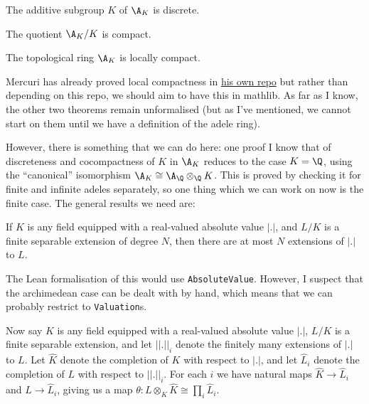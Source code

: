 \begin{theorem}
  \label{NumberField.AdeleRing.discrete}
  The additive subgroup $K$ of $\A_K$ is discrete.
\end{theorem}

\begin{theorem}
  \label{NumberField.AdeleRing.cocompact}
  The quotient $\A_K/K$ is compact.
\end{theorem}

\begin{theorem}
  \label{NumberField.AdeleRing.locallyCompact}
  The topological ring $\A_K$ is locally compact.
\end{theorem}

Mercuri has already proved local compactness in
\href{https://github.com/smmercuri/adele-ring_locally-compact}{his own repo} but rather than
depending on this repo, we should aim to have this in mathlib. As far as I know, the other
two theorems remain unformalised (but as I've mentioned, we cannot start on them until
we have a definition of the adele ring).

However, there is something that we can do here: one proof I know that of discreteness
and cocompactness of $K$ in $\A_K$ reduces to the case $K=\Q$, using the ``canonical''
isomorphism $\A_K\cong\A_{\Q}\otimes_{\Q}K$. This is proved by checking it for finite
and infinite adeles separately, so one thing which we can work on now is the finite case.
The general results we need are:

\begin{theorem}
  If $K$ is any field equipped with a real-valued absolute value $|.|$, and $L/K$ is a finite
  separable extension of degree $N$, then there are at most $N$ extensions of $|.|$ to $L$.
\end{theorem}

The Lean formalisation of this would use {\tt AbsoluteValue}. However, I suspect that the
archimedean case can be dealt with by hand, which means that we can probably restrict to
{\tt Valuation}s.

Now say $K$ is any field equipped with a real-valued absolute value $|.|$, $L/K$ is a finite
separable extension, and let $||.||_i$ denote the finitely many extensions of $|.|$ to $L$.
Let $\hat{K}$ denote the completion of $K$ with respect to $|.|$, and let $\hat{L}_i$ denote
the completion of $L$ with respect to $||.||_i$. For each $i$ we have natural maps
$\hat{K}\to\hat{L}_i$ and $L\to\hat{L}_i$, giving us a map $\theta:
L\otimes_K\hat{K}\cong\prod_i\hat{L}_i$.

